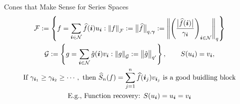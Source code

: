 \documentclass[11pt,compress,xcolor={usenames,dvipsnames},aspectratio=169]{beamer}
\begin{document}
\begin{frame}{Cones that Make Sense for Series Spaces}
\begin{gather*}
    \cf := \left \{ f = \sum_{\vi \in \cn} \hf(\vi) u_{\vi} : \norm[\cf]{f} := \bignorm[q,\vgamma]{\hf} : = \norm[q]{\left(\frac{\bigabs{\hf(\vi)}}{\gamma_{\vi}} \right)_{\vi \in \cn}} \right \} \\
    \cg : = \left \{ g = \sum_{\vi \in \cn} \hg(\vi) v_{\vi} : \norm[\cg]{g} := \bignorm[q']{\hg}\right \}, \qquad S(u_{\vi}) = v_{\vi}, \\
    \text{If } \gamma_{\vi_1} \ge \gamma_{\vi_2} \ge \cdots, \text{ then } \hS_n(f) = \sum_{j=1}^n \hf(\vi_j) v_{\vi_j} \text{ is a good buidling block} \\
    \text{E.g., Function recovery: } S(u_{\vi}) = u_{\vi} = v_{\vi}
\end{gather*}

    
\end{frame}




\thankyouframe

\printbibliography
\end{document}
